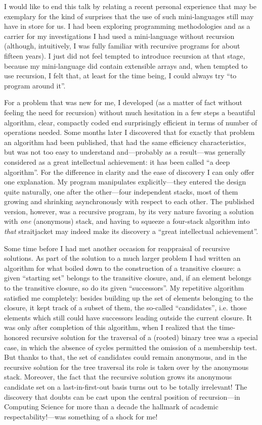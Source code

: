 \documentclass[12pt,letterpaper]{article}
\begin{document}
I would like to end this talk by relating a recent personal experience that may
be exemplary for the kind of surprises that the use of such mini-languages
still may have in store for us. I had been exploring programming methodologies
and as a carrier for my investigations I had used a mini-language without
recursion (although, intuitively, I was fully familiar with recursive programs
for about fifteen years). I just did not feel tempted to introduce recursion at
that stage, because my mini-language did contain extensible arrays and, when
tempted to use recursion, I felt that, at least for the time being, I could
always try ``to program around it''. 

For a problem that was new for me, I developed (as a matter of fact without
feeling the need for recursion) without much hesitation in a few steps a
beautiful algorithm, clear, compactly coded end surprisingly efficient in terms
of number of operations needed. Some months later I discovered that for exactly
that problem an algorithm had been published, that had the same efficiency
characteristics, but was not too easy to understand and---probably as a
result---was generally considered as a great intellectual achievement: it has
been called ``a deep algorithm''. For the difference in clarity and the ease of
discovery I can only offer one explanation. My program manipulates explicitly---they
entered the design quite naturally, one after the other---four
independent stacks, most of them growing and shrinking asynchronously with
respect to each other. The published version, however, was a recursive program,
by its very nature favoring a solution with \emph{one} (anonymous) stack, and having
to squeeze a four-stack algorithm into \emph{that} straitjacket may indeed make its
discovery a ``great intellectual achievement''. 

Some time before I had met another occasion for reappraisal of recursive
solutions. As part of the solution to a much larger problem I had written an
algorithm for what boiled down to the construction of a transitive closure: a
given ``starting set'' belongs to the transitive closure, and, if an element
belongs to the transitive closure, so do its given ``successors''. My repetitive
algorithm satisfied me completely: besides building up the set of elements
belonging to the closure, it kept track of a subset of them, the so-called
``candidates'', i.e. those elements which still could have successors leading
outside the current closure. It was only after completion of this algorithm,
when I realized that the time-honored recursive solution for the traversal of
a (rooted) binary tree was a special case, in which the absence of cycles
permitted the omission of a membership test. But thanks to that, the set of
candidates could remain anonymous, and in the recursive solution for the tree
traversal its role is taken over by the anonymous stack. Moreover, the fact
that the recursive solution grows its anonymous candidate set on a
last-in-first-out basis turns out to be totally irrelevant! The discovery that
doubts can be cast upon the central position of recursion---in Computing
Science for more than a decade the hallmark of academic respectability!---was
something of a shock for me! 
\end{document}
